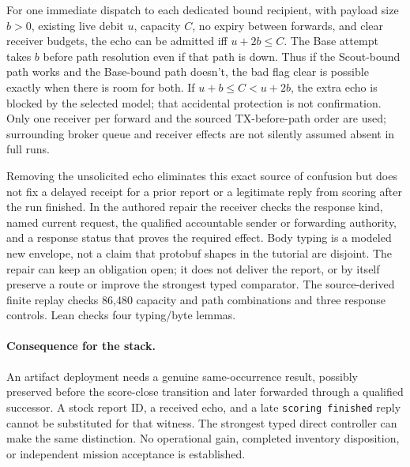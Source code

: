 \documentclass[11pt]{article}
\begin{document}
For one immediate dispatch to each dedicated bound recipient, with
payload size $b>0$, existing live debit $u$, capacity $C$, no expiry
between forwards, and clear receiver budgets, the echo can be
admitted iff $u+2b\le C$. The Base attempt takes $b$ before path
resolution even if that path is down. Thus if the Scout-bound path
works and the Base-bound path doesn't, the bad flag clear is
possible exactly when there is room for both. If $u+b\le C<u+2b$,
the extra echo is blocked by the selected model; that accidental
protection is not confirmation. Only one receiver per forward and
the sourced TX-before-path order are used; surrounding broker queue
and receiver effects are not silently assumed absent in full runs.

Removing the unsolicited echo eliminates this exact source of
confusion but does not fix a delayed receipt for a prior report or
a legitimate reply from scoring after the run finished. In the
authored repair the receiver checks the response kind, named current
request, the qualified accountable sender or forwarding authority,
and a response status that proves the required effect. Body typing
is a modeled new envelope, not a claim that protobuf shapes in the
tutorial are disjoint. The repair can keep an obligation open; it
does not deliver the report, or by itself preserve a route or improve
the strongest typed comparator. The source-derived finite replay
checks 86,480 capacity and path combinations and three response
controls. Lean checks four typing/byte lemmas.

\paragraph{Consequence for the stack.} An artifact deployment needs
a genuine same-occurrence result, possibly preserved before the
score-close transition and later forwarded through a qualified
successor. A stock report ID, a received echo, and a late
\texttt{scoring finished} reply cannot be substituted for that witness.
The strongest typed direct controller can make the same distinction.
No operational gain, completed inventory disposition, or independent
mission acceptance is established.
\end{document}
